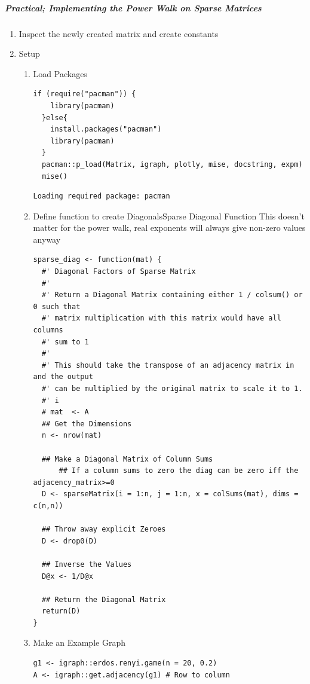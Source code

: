 \documentclass[11pt]{article}
\begin{document}
\subparagraph{Practical; Implementing the Power Walk on Sparse Matrices}
\label{sec:org97d942c}
\begin{enumerate}
\item Inspect the newly created matrix and create constants
\label{sec:org0806e22}
\item Setup
\label{sec:org7343847}
\begin{enumerate}
\item Load Packages
\label{sec:org9260e05}
\begin{verbatim}
if (require("pacman")) {
    library(pacman)
  }else{
    install.packages("pacman")
    library(pacman)
  }
  pacman::p_load(Matrix, igraph, plotly, mise, docstring, expm)
  mise()
\end{verbatim}

\begin{verbatim}
Loading required package: pacman
\end{verbatim}

\item Define function to create DiagonalsSparse Diagonal Function
\label{sec:org3f3d1ae}
This doesn't matter for the power walk, real exponents will always give non-zero values anyway
\begin{verbatim}
sparse_diag <- function(mat) {
  #' Diagonal Factors of Sparse Matrix
  #'
  #' Return a Diagonal Matrix containing either 1 / colsum() or 0 such that
  #' matrix multiplication with this matrix would have all columns
  #' sum to 1
  #'
  #' This should take the transpose of an adjacency matrix in and the output
  #' can be multiplied by the original matrix to scale it to 1.
  #' i
  # mat  <- A
  ## Get the Dimensions
  n <- nrow(mat)

  ## Make a Diagonal Matrix of Column Sums
      ## If a column sums to zero the diag can be zero iff the adjacency_matrix>=0
  D <- sparseMatrix(i = 1:n, j = 1:n, x = colSums(mat), dims = c(n,n))

  ## Throw away explicit Zeroes
  D <- drop0(D)

  ## Inverse the Values
  D@x <- 1/D@x

  ## Return the Diagonal Matrix
  return(D)
}
\end{verbatim}

\item Make an Example Graph
\label{sec:orgdf9ef8f}
\begin{verbatim}
g1 <- igraph::erdos.renyi.game(n = 20, 0.2)
A <- igraph::get.adjacency(g1) # Row to column



\end{verbatim}
\end{enumerate}
\end{enumerate}
\end{document}
